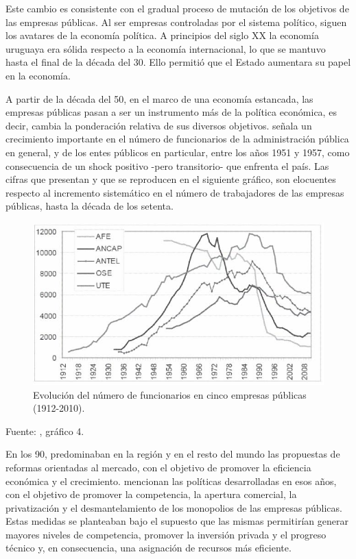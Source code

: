 \documentclass[
  12pt,
  spanish,
]{book}
\begin{document}
Este cambio es consistente con el gradual proceso de mutación de los
objetivos de las empresas públicas. Al ser empresas controladas por el
sistema político, siguen los avatares de la economía política. A
principios del siglo XX la economía uruguaya era sólida respecto a la
economía internacional, lo que se mantuvo hasta el final de la década
del 30. Ello permitió que el Estado aumentara su papel en la economía.

A partir de la década del 50, en el marco de una economía estancada, las
empresas públicas pasan a ser un instrumento más de la política
económica, es decir, cambia la ponderación relativa de sus diversos
objetivos. \citet{Rama1990} señala un crecimiento importante en el
número de funcionarios de la administración pública en general, y de los
entes públicos en particular, entre los años 1951 y 1957, como
consecuencia de un shock positivo -pero transitorio- que enfrenta el
país. Las cifras que presentan \citet{Bertino2012} y que se reproducen
en el siguiente gráfico, son elocuentes respecto al incremento
sistemático en el número de trabajadores de las empresas públicas, hasta
la década de los setenta.

\begin{figure}
\centering
\includegraphics{imagenes/fig5.jpg}
\caption{Evolución del número de funcionarios en cinco empresas públicas
(1912-2010).}
\end{figure}

Fuente: \citet{Bertino2012}, gráfico 4.

En los 90, predominaban en la región y en el resto del mundo las
propuestas de reformas orientadas al mercado, con el objetivo de
promover la eficiencia económica y el crecimiento. \citet{Forteza2003}
mencionan las políticas desarrolladas en esos años, con el objetivo de
promover la competencia, la apertura comercial, la privatización y el
desmantelamiento de los monopolios de las empresas públicas. Estas
medidas se planteaban bajo el supuesto que las mismas permitirían
generar mayores niveles de competencia, promover la inversión privada y
el progreso técnico y, en consecuencia, una asignación de recursos más
eficiente.
\end{document}
